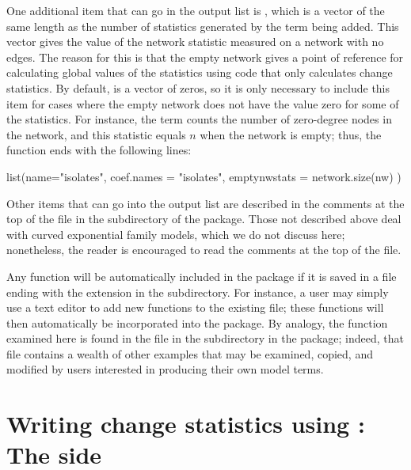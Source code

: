 \documentclass[nojss]{jss}
\begin{document}
One additional item that can go
in the output list is , which is a vector of the
same length as the number of statistics generated by the term being added.  This vector
gives the value of the network statistic measured on a network with no edges.  The reason for
this is that the empty network gives a point of reference for calculating global values of the statistics using  code that only calculates change statistics.
By default,  is a vector of zeros, so it is only necessary to include this
item for cases where the empty network does not have the value zero for some of the statistics.
For instance, the  term counts the number of zero-degree nodes in the network,
and this statistic equals $n$ when the network is empty; thus, the 
function ends with the following lines:
\begin{CodeChunk}
\begin{CodeInput}
  list(name="isolates",
       coef.names = "isolates",
       emptynwstats = network.size(nw) )
\end{CodeInput}
\end{CodeChunk}

Other items that can go into the
output list are described in the comments at the top of the
 file in the  subdirectory of the 
package.  Those not described above deal with curved exponential family models,
which we do not discuss here; nonetheless, the reader is encouraged to read the
comments at the top of the  file.

Any  function will be automatically included in the 
package if it is saved in a file ending with the extension  in the  subdirectory.
For instance, a user may simply use a text editor to add new 
functions to the existing  file; these
functions will then automatically be incorporated into the 
package.  By analogy, the  function examined here is 
found in the  file in the  subdirectory in the
 package; indeed, that file contains a wealth of other examples that
may be examined, copied, and modified by users interested in 
producing their own model terms.

\section[Writing change statistics using ergm.userterms:  The C side]%
{Writing change statistics using :  The  side}
\label{Cside}
\end{document}
